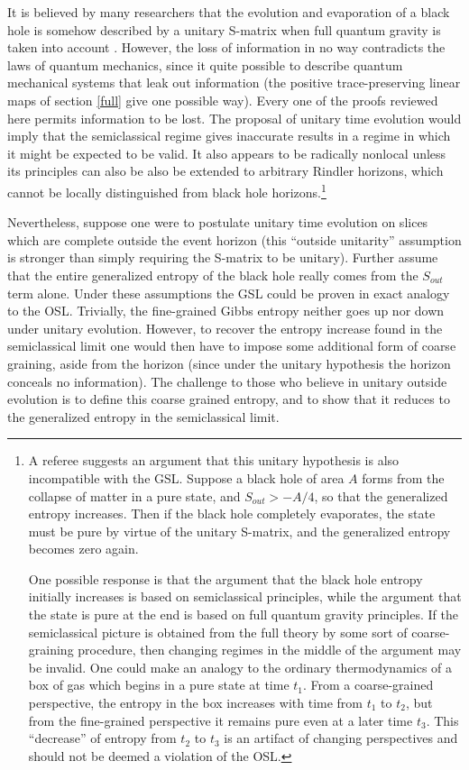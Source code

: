 \documentclass[12pt]{article}
\begin{document}
It is believed by many researchers that the evolution and evaporation of a black hole is somehow described by a unitary S-matrix when full quantum gravity is taken into account \cite{preskill93}.  However, the loss of information in no way contradicts the laws of quantum mechanics, since it quite possible to describe quantum mechanical systems that leak out information (the positive trace-preserving linear maps of section \ref{full} give one possible way).  Every one of the proofs reviewed here permits information to be lost.  The proposal of unitary time evolution would imply that the semiclassical regime gives inaccurate results in a regime in which it might be expected to be valid.  It also appears to be radically nonlocal unless its principles can also be also be extended to arbitrary Rindler horizons, which cannot be locally distinguished from black hole horizons.\footnote{A referee suggests an argument that this unitary hypothesis is also incompatible with the GSL.  Suppose a black hole of area $A$ forms from the collapse of matter in a pure state, and $S_{out} > -A/4$, so that the generalized entropy increases.  Then if the black hole completely evaporates, the state must be pure by virtue of the unitary S-matrix, and the generalized entropy becomes zero again.

One possible response is that the argument that the black hole entropy initially increases is based on semiclassical principles, while the argument that the state is pure at the end is based on full quantum gravity principles.  If the semiclassical picture is obtained from the full theory by some sort of coarse-graining procedure, then changing regimes in the middle of the argument may be invalid.  One could make an analogy to the ordinary thermodynamics of a box of gas which begins in a pure state at time $t_1$.  From a coarse-grained perspective, the entropy in the box increases with time from $t_1$ to $t_2$, but from the fine-grained perspective it remains pure even at a later time $t_3$.  This ``decrease'' of entropy from $t_2$ to $t_3$ is an artifact of changing perspectives and should not be deemed a violation of the OSL.}

Nevertheless, suppose one were to postulate unitary time evolution on slices which are complete outside the event horizon (this ``outside unitarity'' assumption is stronger than simply requiring the S-matrix to be unitary).  Further assume that the entire generalized entropy of the black hole really comes from the $S_{out}$ term alone.  Under these assumptions the GSL could be proven in exact analogy to the OSL.  Trivially, the fine-grained Gibbs entropy neither goes up nor down under unitary evolution.  However, to recover the entropy increase found in the semiclassical limit one would then have to impose some additional form of coarse graining, aside from the horizon (since under the unitary hypothesis the horizon conceals no information).  The challenge to those who believe in unitary outside evolution is to define this coarse grained entropy, and to show that it reduces to the generalized entropy in the semiclassical limit.
\end{document}
